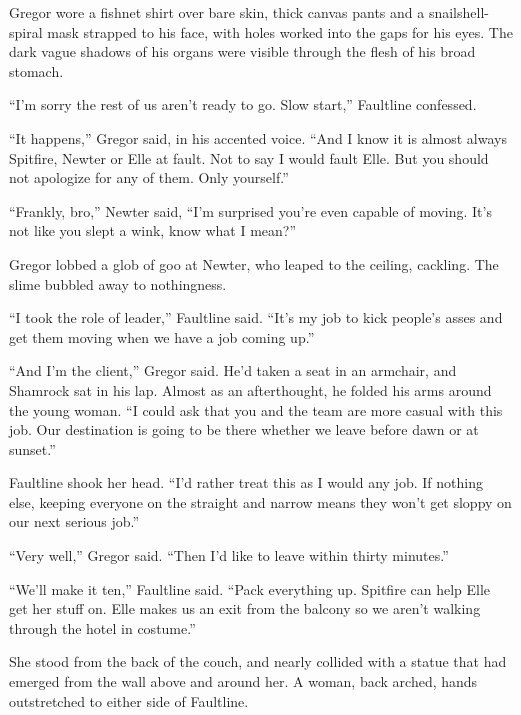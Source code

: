 Gregor wore a fishnet shirt over bare skin, thick canvas pants and a snailshell-spiral mask strapped to his face, with holes worked into the gaps for his eyes.  The dark vague shadows of his organs were visible through the flesh of his broad stomach.



``I'm sorry the rest of us aren't ready to go.  Slow start,'' Faultline confessed.



``It happens,'' Gregor said, in his accented voice.  ``And I know it is almost always Spitfire, Newter or Elle at fault.  Not to say I would fault Elle.  But you should not apologize for any of them.  Only yourself.''



``Frankly, bro,'' Newter said, ``I'm surprised you're even capable of moving.  It's not like you slept a wink, know what I mean?''



Gregor lobbed a glob of goo at Newter, who leaped to the ceiling, cackling.  The slime bubbled away to nothingness.



``I took the role of leader,'' Faultline said. ``It's my job to kick people's asses and get them moving when we have a job coming up.''



``And I'm the client,'' Gregor said.  He'd taken a seat in an armchair, and Shamrock sat in his lap.  Almost as an afterthought, he folded his arms around the young woman.  ``I could ask that you and the team are more casual with this job.  Our destination is going to be there whether we leave before dawn or at sunset.''



Faultline shook her head.  ``I'd rather treat this as I would any job.  If nothing else, keeping everyone on the straight and narrow means they won't get sloppy on our next serious job.''



``Very well,'' Gregor said.  ``Then I'd like to leave within thirty minutes.''



``We'll make it ten,'' Faultline said.  ``Pack everything up.  Spitfire can help Elle get her stuff on.  Elle makes us an exit from the balcony so we aren't walking through the hotel in costume.''



She stood from the back of the couch, and nearly collided with a statue that had emerged from the wall above and around her.  A woman, back arched, hands outstretched to either side of Faultline.



